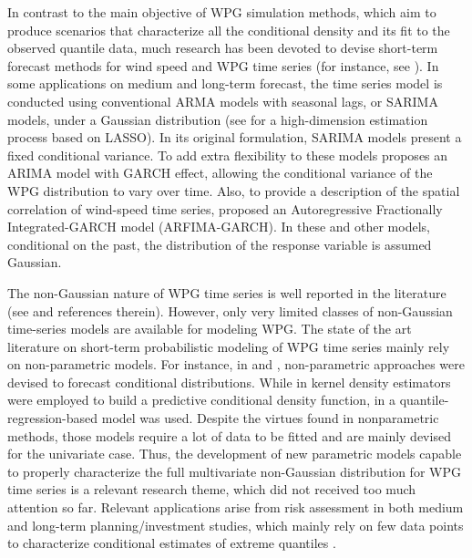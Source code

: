 \documentclass[a4paper]{IEEEtran}
\begin{document}
In contrast to the main objective of WPG simulation methods, which aim to produce scenarios that characterize all the conditional density and its fit to the observed quantile data, much research has been devoted to devise short-term forecast methods for wind speed and WPG time series (for instance, see \cite{zhang2014review}). In some applications on medium and long-term forecast, the time series model is conducted using conventional ARMA models with seasonal lags, or SARIMA models, under a Gaussian distribution (see \cite{souto2014high} for a high-dimension estimation process based on LASSO). In its original formulation, SARIMA models present a fixed conditional variance. To add extra flexibility to these models \cite{lau2010approaches} proposes an ARIMA model with GARCH effect, allowing the conditional variance of the WPG distribution to vary over time. Also, to provide a description of the spatial correlation of wind-speed time series, \cite{taylor2009wind} proposed an Autoregressive Fractionally Integrated-GARCH model (ARFIMA-GARCH). In these and other models, conditional on the past, the distribution of the response variable is assumed Gaussian.

The non-Gaussian nature of WPG time series is well reported in the literature (see \cite{bessa2012time,jeon2012using,taylor2015forecasting,Wan2017} and references therein). However, only very limited classes of non-Gaussian time-series models are available for modeling WPG. The state of the art literature on short-term probabilistic modeling of WPG time series mainly rely on non-parametric models. For instance, in \cite{bessa2012time} and \cite{Wan2017}, non-parametric approaches were devised to forecast conditional distributions. While in \cite{bessa2012time} kernel density estimators were employed to build a predictive conditional density function, in \cite{Wan2017} a quantile-regression-based model was used. Despite the virtues found in nonparametric methods, those models require a lot of data to be fitted and are mainly devised for the univariate case. Thus, the development of new parametric models capable to properly characterize the full multivariate non-Gaussian distribution for WPG time series is a relevant research theme, which did not received too much attention so far. Relevant applications arise from risk assessment in both medium and long-term planning/investment studies, which mainly rely on few data points to characterize conditional estimates of extreme quantiles \cite{FosteringWPP,SHAPIRO2013,Fanzeres2015,Aderson2017,kariniotakis2017renewable}.
\end{document}
